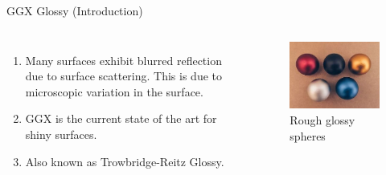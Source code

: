 \documentclass[10pt]{beamer}
\begin{document}
\begin{frame}{GGX Glossy (Introduction)}
  \begin{columns}
    \begin{enumerate}
    \item Many surfaces exhibit blurred reflection due to surface scattering.
      This is due to microscopic variation in the surface.
    \item GGX is the current state of the art for shiny surfaces.
    \item Also known as Trowbridge-Reitz Glossy.
    \end{enumerate}

    \begin{figure}[H]
      \centering
      \includegraphics[width=\linewidth,keepaspectratio]{rough_glossy.jpg}
      \caption{Rough glossy spheres}
    \end{figure}
  \end{columns}
\end{frame}
\end{document}
